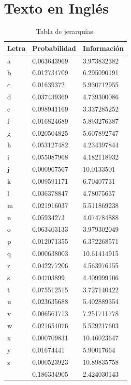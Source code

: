 \documentclass[12pt,letterpaper]{article}
\begin{document}
\section{Texto en Inglés}
\begin{table}[ht]
    \centering
    \begin{tabular}{|l|l|l|}
    \hline
    Letra & Probabilidad & Información \\ \hline
    a &	0.063643969	& 3.973832382 \\ \hline
    b &	0.012734709	& 6.295090191 \\ \hline
    c &	0.01639372	& 5.930712955 \\ \hline
    d &	0.037439369	& 4.739300086 \\ \hline
    e &	0.098941169	& 3.337285252 \\ \hline
    f &	0.016824689	& 5.893276387 \\ \hline
    g &	0.020504825	& 5.607892747 \\ \hline
    h &	0.053127482	& 4.234397844 \\ \hline
    i &	0.055087968	& 4.182118932 \\ \hline
    j &	0.000967567	& 10.0133501  \\ \hline
    k &	0.009591171	& 6.70407731  \\ \hline
    l &	0.036378847	& 4.78075637  \\ \hline
    m &	0.021916037	& 5.511869238 \\ \hline
    n &	0.05934273	& 4.074784888 \\ \hline
    o &	0.063403133	& 3.979302049 \\ \hline
    p &	0.012071355	& 6.372268571 \\ \hline
    q &	0.000638003	& 10.61414915 \\ \hline
    r &	0.042277206	& 4.563976155 \\ \hline
    s &	0.04703899	& 4.409999106 \\ \hline
    t &	0.075512515	& 3.727140422 \\ \hline
    u &	0.023635688	& 5.402889354 \\ \hline
    v &	0.006561713	& 7.251711778 \\ \hline
    w &	0.021654076	& 5.529217603 \\ \hline
    x &	0.000709831	& 10.46023647 \\ \hline
    y &	0.01674441	& 5.90017664  \\ \hline
    z &	0.000523923	& 10.89835758 \\ \hline
    &	0.186334905	& 2.424030143 \\ \hline
    \end{tabular}
    \caption{Tabla de jerarquías.}
    \label{my-label}
\end{table}
\end{document}
